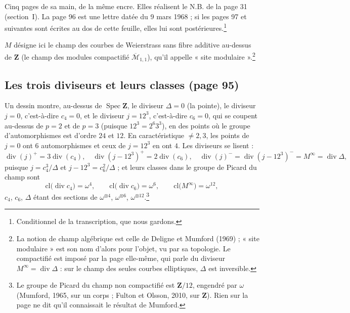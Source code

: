 \documentclass[11pt,a4paper]{article}
\begin{document}
Cinq pages de sa main, de la même encre. Elles réalisent le N.B. de la page 31
(section~I). La page 96 est une lettre datée du 9 mars 1968 ; si les pages
97 et suivantes sont écrites au dos de cette feuille, elles lui sont
postérieures.\footnote{Conditionnel de la transcription, que nous gardons.}

$M$ désigne ici le champ des courbes de Weierstrass sans fibre additive au-dessus
de $\mathbf{Z}$ (le champ des modules compactifié
$\overline{\mathcal{M}}_{1,1}$), qu'il appelle « site modulaire ».\footnote{La
notion de champ algébrique est celle de Deligne et Mumford (1969) ; « site
modulaire » est son nom d'alors pour l'objet, vu par sa topologie. Le
compactifié est imposé par la page elle-même, qui parle du diviseur
$M^{\infty} = \operatorname{div}\Delta$ : sur le champ des seules courbes
elliptiques, $\Delta$ est inversible.}

\subsection*{Les trois diviseurs et leurs classes (page 95)}

Un dessin montre, au-dessus de $\operatorname{Spec}\mathbf{Z}$, le diviseur
$\Delta = 0$ (la pointe), le diviseur $j = 0$, c'est-à-dire $c_4 = 0$, et le
diviseur $j = 12^3$, c'est-à-dire $c_6 = 0$, qui se coupent au-dessus de $p =
2$ et de $p = 3$ (puisque $12^3 = 2^6 3^3$), en des points où le groupe
d'automorphismes est d'ordre $24$ et $12$. En caractéristique $\neq 2,3$, les
points de $j = 0$ ont $6$ automorphismes et ceux de $j = 12^3$ en ont $4$. Les
diviseurs se lisent :
\[
\operatorname{div}(j)^{+} = 3\operatorname{div}(c_4), \quad
\operatorname{div}(j-12^3)^{+} = 2\operatorname{div}(c_6), \quad
\operatorname{div}(j)^{-} = \operatorname{div}(j-12^3)^{-} = M^{\infty} =
\operatorname{div}\Delta,
\]
puisque $j = c_4^3/\Delta$ et $j - 12^3 = c_6^2/\Delta$ ; et leurs classes dans
le groupe de Picard du champ sont
\[
\mathrm{cl}\bigl(\operatorname{div} c_4\bigr) = \omega^{4}, \qquad
\mathrm{cl}\bigl(\operatorname{div} c_6\bigr) = \omega^{6}, \qquad
\mathrm{cl}\bigl(M^{\infty}\bigr) = \omega^{12},
\]
$c_4$, $c_6$, $\Delta$ étant des sections de $\omega^{\otimes 4}$,
$\omega^{\otimes 6}$, $\omega^{\otimes 12}$.\footnote{Le groupe de Picard du
champ non compactifié est $\mathbf{Z}/12$, engendré par $\omega$ (Mumford,
1965, sur un corps ; Fulton et Olsson, 2010, sur $\mathbf{Z}$). Rien sur la
page ne dit qu'il connaissait le résultat de Mumford.}
\end{document}
